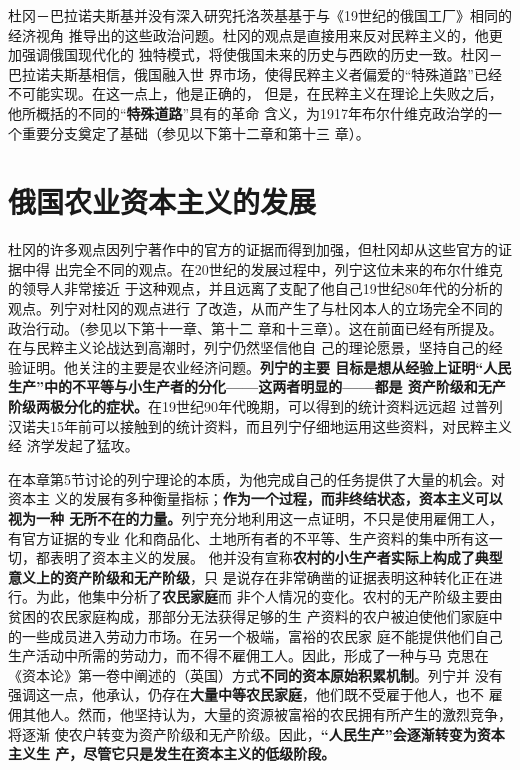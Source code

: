 杜冈－巴拉诺夫斯基并没有深入研究托洛茨基基于与《19世纪的俄国工厂》相同的经济视角
推导出的这些政治问题。杜冈的观点是直接用来反对民粹主义的，他更加强调俄国现代化的
独特模式，将使俄国未来的历史与西欧的历史一致。杜冈－巴拉诺夫斯基相信，俄国融入世
界市场，使得民粹主义者偏爱的“特殊道路”已经不可能实现。在这一点上，他是正确的，
但是，在民粹主义在理论上失败之后，他所概括的不同的“\textbf{特殊道路}”具有的革命
含义，为1917年布尔什维克政治学的一个重要分支奠定了基础（参见以下第十二章和第十三
章）。

\section{俄国农业资本主义的发展}
杜冈的许多观点因列宁著作中的官方的证据而得到加强，但杜冈却从这些官方的证据中得
出完全不同的观点。在20世纪的发展过程中，列宁这位未来的布尔什维克的领导人非常接近
于这种观点，并且远离了支配了他自己19世纪80年代的分析的观点。列宁对杜冈的观点进行
了改造，从而产生了与杜冈本人的立场完全不同的政治行动。（参见以下第十一章、第十二
章和十三章）。这在前面已经有所提及。在与民粹主义论战达到高潮时，列宁仍然坚信他自
己的理论愿景，坚持自己的经验证明。他关注的主要是农业经济问题。\textbf{列宁的主要
  目标是想从经验上证明“人民生产”中的不平等与小生产者的分化——这两者明显的——都是
  资产阶级和无产阶级两极分化的症状。}在19世纪90年代晚期，可以得到的统计资料远远超
过普列汉诺夫15年前可以接触到的统计资料，而且列宁仔细地运用这些资料，对民粹主义经
济学发起了猛攻。

在本章第5节讨论的列宁理论的本质，为他完成自己的任务提供了大量的机会。对资本主
义的发展有多种衡量指标；\textbf{作为一个过程，而非终结状态，资本主义可以视为一种
  无所不在的力量。}列宁充分地利用这一点证明，不只是使用雇佣工人，有官方证据的专业
化和商品化、土地所有者的不平等、生产资料的集中所有这一切，都表明了资本主义的发展。
他并没有宣称\textbf{农村的小生产者实际上构成了典型意义上的资产阶级和无产阶级}，只
是说存在非常确凿的证据表明这种转化正在进行。为此，他集中分析了\textbf{农民家庭}而
非个人情况的变化。农村的无产阶级主要由贫困的农民家庭构成，那部分无法获得足够的生
产资料的农户被迫使他们家庭中的一些成员进入劳动力市场。在另一个极端，富裕的农民家
庭不能提供他们自己生产活动中所需的劳动力，而不得不雇佣工人。因此，形成了一种与马
克思在《资本论》第一卷中阐述的（英国）方式\textbf{不同的资本原始积累机制}。列宁并
没有强调这一点，他承认，仍存在\textbf{大量中等农民家庭}，他们既不受雇于他人，也不
雇佣其他人。然而，他坚持认为，大量的资源被富裕的农民拥有所产生的激烈竞争，将逐渐
使农户转变为资产阶级和无产阶级。因此，\textbf{“人民生产”会逐渐转变为资本主义生
  产，尽管它只是发生在资本主义的低级阶段。}

